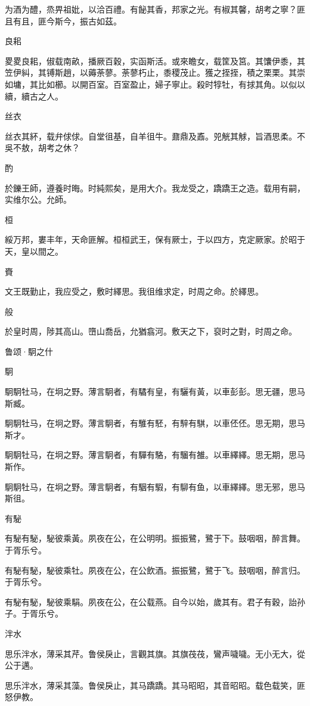 为酒为醴，烝畀祖妣，以洽百禮。有飶其香，邦家之光。有椒其馨，胡考之寧？匪且有且，匪今斯今，振古如茲。

良耜

畟畟良耜，俶载南畝，播厥百穀，实函斯活。或來瞻女，载筐及筥。其馕伊黍，其笠伊糾，其镈斯趙，以薅荼蓼。荼蓼朽止，黍稷茂止。獲之挃挃，積之栗栗。其崇如墉，其比如櫛。以開百室。百室盈止，婦子寧止。殺时犉牡，有捄其角。以似以續，續古之人。

丝衣

丝衣其紑，载弁俅俅。自堂徂基，自羊徂牛。鼐鼎及鼒。兕觥其觩，旨酒思柔。不吳不敖，胡考之休？

酌

於鑠王師，遵養时晦。时純熙矣，是用大介。我龙受之，蹻蹻王之造。载用有嗣，实维尔公。允師。

桓

綏万邦，婁丰年，天命匪解。桓桓武王，保有厥士，于以四方，克定厥家。於昭于天，皇以間之。

賚

文王既勤止，我应受之，敷时繹思。我徂维求定，时周之命。於繹思。

般

於皇时周，陟其高山。嶞山喬岳，允猶翕河。敷天之下，裒时之對，时周之命。




鲁颂·駉之什


駉

駉駉牡马，在坰之野。薄言駉者，有驈有皇，有驪有黃，以車彭彭。思无疆，思马斯臧。

駉駉牡马，在坰之野。薄言駉者，有騅有駓，有騂有騏，以車伾伾。思无期，思马斯才。

駉駉牡马，在坰之野。薄言駉者，有驒有駱，有騮有雒。以車繹繹。思无期，思马斯作。

駉駉牡马，在坰之野。薄言駉者，有駰有騢，有駠有鱼，以車繹繹。思无邪，思马斯徂。

有駜

有駜有駜，駜彼乘黃。夙夜在公，在公明明。振振鷺，鷺于下。鼓咽咽，醉言舞。于胥乐兮。

有駜有駜，駜彼乘牡。夙夜在公，在公飲酒。振振鷺，鷺于飞。鼓咽咽，醉言归。于胥乐兮。

有駜有駜，駜彼乘駽。夙夜在公，在公载燕。自今以始，歲其有。君子有穀，詒孙子。于胥乐兮。

泮水

思乐泮水，薄采其芹。鲁侯戾止，言觀其旗。其旗茷茷，鸞声噦噦。无小无大，從公于邁。

思乐泮水，薄采其藻。鲁侯戾止，其马蹻蹻。其马昭昭，其音昭昭。载色载笑，匪怒伊教。

